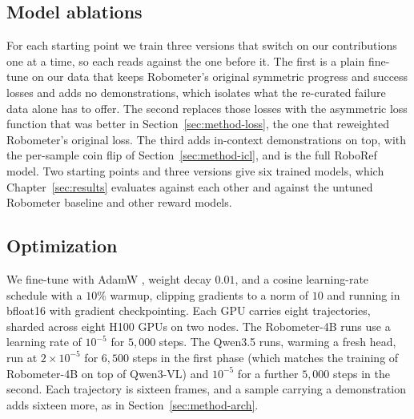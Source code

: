 \subsection{Model ablations}

For each starting point we train three versions that switch on our contributions one at a time, so each reads against the one before it. The first is a plain fine-tune on our data that keeps Robometer's original symmetric progress and success losses and adds no demonstrations, which isolates what the re-curated failure data alone has to offer. The second replaces those losses with the asymmetric loss function that was better in Section~\ref{sec:method-loss}, the one that reweighted Robometer's original loss. The third adds in-context demonstrations on top, with the per-sample coin flip of Section~\ref{sec:method-icl}, and is the full RoboRef model. Two starting points and three versions give six trained models, which Chapter~\ref{sec:results} evaluates against each other and against the untuned Robometer baseline and other reward models.

\subsection{Optimization}

We fine-tune with AdamW \citep{loshchilov_decoupled_2019}, weight decay $0.01$, and a cosine learning-rate schedule with a $10\%$ warmup, clipping gradients to a norm of $10$ and running in bfloat16 with gradient checkpointing. Each GPU carries eight trajectories, sharded across eight H100 GPUs on two nodes. The Robometer-4B runs use a learning rate of $10^{-5}$ for $5{,}000$ steps. The Qwen3.5 runs, warming a fresh head, run at $2\times10^{-5}$ for $6{,}500$ steps in the first phase (which matches the training of Robometer-4B on top of Qwen3-VL) and $10^{-5}$ for a further $5{,}000$ steps in the second. Each trajectory is sixteen frames, and a sample carrying a demonstration adds sixteen more, as in Section~\ref{sec:method-arch}.

